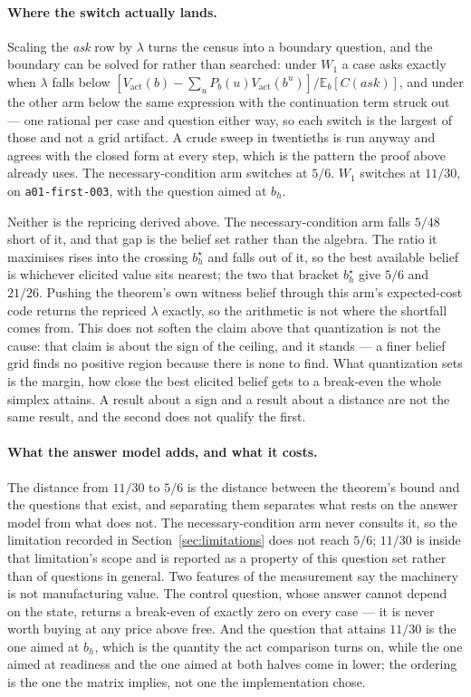\documentclass{article}
\begin{document}
\paragraph{Where the switch actually lands.} Scaling the \emph{ask} row by $\lambda$
turns the census into a boundary question, and the boundary can be solved for rather
than searched: under $W_1$ a case asks exactly when $\lambda$ falls below
$[V_{\mathrm{act}}(b) - \sum_u P_b(u) V_{\mathrm{act}}(b^u)] /
\mathbb{E}_b[C(\textit{ask})]$, and under the other arm below the same expression with
the continuation term struck out --- one rational per case and question either way, so
each switch is the largest of those and not a grid artifact.
A crude sweep in twentieths is run anyway and agrees with the closed form at every
step, which is the pattern the proof above already uses. The necessary-condition arm
switches at $5/6$. $W_1$ switches at $11/30$, on \texttt{a01-first-003}, with the
question aimed at $b_h$.

Neither is the repricing derived above. The necessary-condition arm falls $5/48$
short of it, and that gap is the belief set rather than the algebra. The ratio it
maximises rises into the crossing $b_h^{\star}$ and falls out of it, so the best
available belief is whichever elicited value sits nearest; the two that bracket
$b_h^{\star}$ give $5/6$ and $21/26$. Pushing the theorem's own witness belief
through this arm's expected-cost code returns the repriced $\lambda$ exactly, so the
arithmetic is not where the shortfall comes from. This does not soften the claim
above that quantization is not the cause: that claim is about the sign of the ceiling,
and it stands --- a finer belief grid finds no positive region because there is none
to find. What quantization sets is the margin, how close the best elicited belief gets
to a break-even the whole simplex attains. A result about a sign and a result about a
distance are not the same result, and the second does not qualify the first.

\paragraph{What the answer model adds, and what it costs.} The distance from $11/30$
to $5/6$ is the distance between the theorem's bound and the questions that exist,
and separating them separates what rests on the answer model from what does not. The
necessary-condition arm never consults it, so the limitation recorded in
Section~\ref{sec:limitations} does not reach $5/6$; $11/30$ is inside that
limitation's scope and is reported as a property of this question set rather than of
questions in general. Two features of the measurement say the machinery is not
manufacturing value. The control question, whose answer cannot depend on the state,
returns a break-even of exactly zero on every case --- it is never worth buying at any
price above free. And the question that attains $11/30$ is the one aimed at $b_h$,
which is the quantity the act comparison turns on, while the one aimed at readiness
and the one aimed at both halves come in lower; the ordering is the one the matrix
implies, not one the implementation chose.
\end{document}
